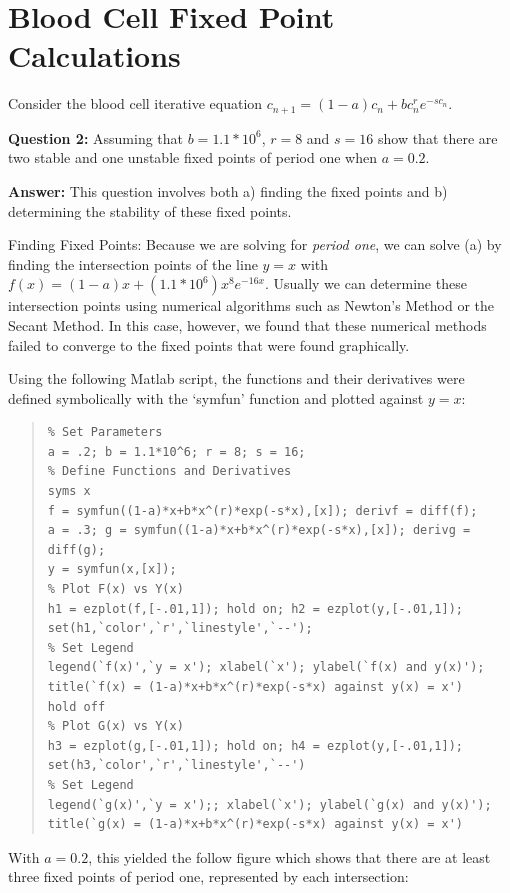 \documentclass[12pt]{article}
\begin{document}
\section*{Blood Cell Fixed Point Calculations}
Consider the blood cell iterative equation $c_{n+1} = (1-a)c_{n}+bc_{n}^{r}e^{-sc_{n}}$.

\textbf{Question 2:} Assuming that $b=1.1*10^{6}$, $r=8$ and $s=16$ show that there are two stable and one unstable fixed points of period one when $a=0.2$.

\textbf{Answer:} This question involves both a) finding the fixed points and b) determining the stability of these fixed points. 

Finding Fixed Points: Because we are solving for \emph{period one}, we can solve (a) by finding the intersection points of the line $y=x$ with $f(x) = (1-a)x+(1.1*10^{6})x^{8}e^{-16x}$. Usually we can determine these intersection points using numerical algorithms such as Newton's Method or the Secant Method. In this case, however, we found that these numerical methods failed to converge to the fixed points that were found graphically.

Using the following Matlab script, the functions and their derivatives were defined symbolically with the `symfun' function and plotted against $y=x$:

\begin{quote}
	\begin{verbatim}
% Set Parameters
a = .2; b = 1.1*10^6; r = 8; s = 16;
% Define Functions and Derivatives
syms x
f = symfun((1-a)*x+b*x^(r)*exp(-s*x),[x]); derivf = diff(f);
a = .3; g = symfun((1-a)*x+b*x^(r)*exp(-s*x),[x]); derivg = diff(g);
y = symfun(x,[x]);
% Plot F(x) vs Y(x)
h1 = ezplot(f,[-.01,1]); hold on; h2 = ezplot(y,[-.01,1]); 
set(h1,`color',`r',`linestyle',`--');
% Set Legend 
legend(`f(x)',`y = x'); xlabel(`x'); ylabel(`f(x) and y(x)');
title(`f(x) = (1-a)*x+b*x^(r)*exp(-s*x) against y(x) = x')
hold off
% Plot G(x) vs Y(x)
h3 = ezplot(g,[-.01,1]); hold on; h4 = ezplot(y,[-.01,1]);
set(h3,`color',`r',`linestyle',`--')
% Set Legend
legend(`g(x)',`y = x');; xlabel(`x'); ylabel(`g(x) and y(x)'); 
title(`g(x) = (1-a)*x+b*x^(r)*exp(-s*x) against y(x) = x')
\end{verbatim}
\end{quote}

\pagebreak{}

With $a=0.2$, this yielded the follow figure which shows that there are at least three fixed points of period one, represented by each intersection: 
\end{document}
